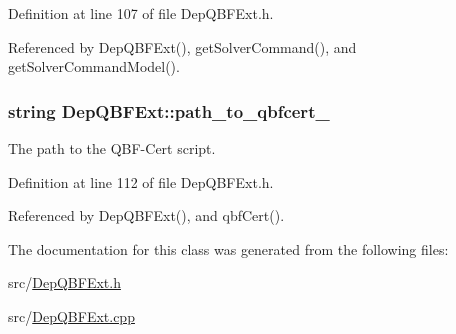 Definition at line 107 of file Dep\-Q\-B\-F\-Ext.\-h.



Referenced by Dep\-Q\-B\-F\-Ext(), get\-Solver\-Command(), and get\-Solver\-Command\-Model().

\hypertarget{classDepQBFExt_a05676410e9b70c5e83cb13b708e2f178}{
\subsubsection[{path\-\_\-to\-\_\-qbfcert\-\_\-}]{\setlength{\rightskip}{0pt plus 5cm}string Dep\-Q\-B\-F\-Ext\-::path\-\_\-to\-\_\-qbfcert\-\_\-\hspace{0.3cm}{\ttfamily [protected]}}}\label{classDepQBFExt_a05676410e9b70c5e83cb13b708e2f178}


The path to the Q\-B\-F-\/\-Cert script. 



Definition at line 112 of file Dep\-Q\-B\-F\-Ext.\-h.



Referenced by Dep\-Q\-B\-F\-Ext(), and qbf\-Cert().



The documentation for this class was generated from the following files\-:\begin{DoxyCompactItemize}
\item 
src/\hyperlink{DepQBFExt_8h}{Dep\-Q\-B\-F\-Ext.\-h}\item 
src/\hyperlink{DepQBFExt_8cpp}{Dep\-Q\-B\-F\-Ext.\-cpp}\end{DoxyCompactItemize}
